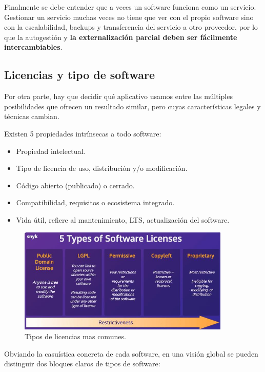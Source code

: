 Finalmente se debe entender que a veces un software funciona como un servicio. Gestionar un servicio muchas veces no tiene que ver con el propio software sino con la escalabilidad, backups y transferencia del servicio a otro proveedor, por lo que la autogestión y \textbf{la externalización parcial deben ser fácilmente intercambiables}.

\subsection{Licencias y tipo de software}
Por otra parte, hay que decidir qué aplicativo usamos entre las múltiples posibilidades que ofrecen un resultado similar, pero cuyas características legales y técnicas cambian. 

Existen 5 propiedades intrínsecas a todo software:
\begin{itemize}
    \item Propiedad intelectual.
    \item Tipo de licencia de uso, distribución y/o modificación.
    \item Código abierto (publicado) o cerrado.
    \item Compatibilidad, requisitos o ecosistema integrado.
    \item Vida útil, refiere al mantenimiento, LTS, actualización del software. 
\end{itemize}

\begin{figure}[!htb]
\begin{center}
\includegraphics[width=0.9\textwidth]{./figuras/licencias.jpg}
\caption{Tipos de licencias mas comunes\cite{c_licencias}.}
\label{F:licencias}
\end{center}
\end{figure}

Obviando la casuística concreta de cada software, en una visión global se pueden distinguir dos bloques claros de tipos de software:

